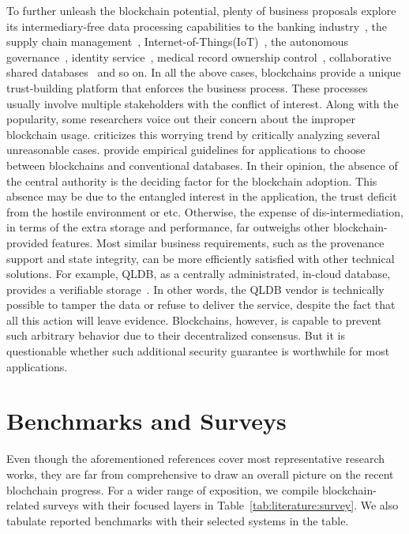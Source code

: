 To further unleash the blockchain potential, plenty of business proposals explore its intermediary-free data processing capabilities to the banking industry~\cite{guo2016blockchain}, the supply chain management~\cite{tse2017blockchain,saberi2019blockchain,korpela2017digital}, Internet-of-Things(IoT)~\cite{novo2018blockchain,huh2017managing,khan2018iot}, the autonomous governance~\cite{diallo2018egov,atzori2015blockchain}, identity service~\cite{lim2018blockchain,lootsma2017fintech}, medical record ownership control~\cite{azaria2016medrec,medilot}, collaborative shared databases~\cite{peng2020falcondb,el2019blockchaindb} and so on. 
In all the above cases, blockchains provide a unique trust-building platform that enforces the business process.
These processes usually involve multiple stakeholders with the conflict of interest.
Along with the popularity, some researchers voice out their concern about the improper blockchain usage. 
\cite{wust2018you} criticizes this worrying trend by critically analyzing several unreasonable cases. 
\cite{yaga2019blockchain,chowdhury2018blockchain,wust2018you} provide empirical guidelines for applications to choose between blockchains and conventional databases. 
In their opinion, the absence of the central authority is the deciding factor for the blockchain adoption. 
This absence may be due to the entangled interest in the application, the trust deficit from the hostile environment or etc. 
Otherwise, the expense of dis-intermediation, in terms of the extra storage and performance, far outweighs other blockchain-provided features. 
Most similar business requirements, such as the provenance support and state integrity, can be more efficiently satisfied with other technical solutions.
For example, QLDB, as a centrally administrated, in-cloud database, provides a verifiable storage~\cite{qldb}. 
In other words, the QLDB vendor is technically possible to tamper the data or refuse to deliver the service, despite the fact that all this action will leave evidence. 
Blockchains, however, is capable to prevent such arbitrary behavior due to their decentralized consensus. 
But it is questionable whether such additional security guarantee is worthwhile for most applications. 

\section{Benchmarks and Surveys}
Even though the aforementioned references cover most representative research works, they are far from comprehensive to draw an overall picture on the recent blochchain progress. 
For a wider range of exposition, we compile blockchain-related surveys with their focused layers in Table~\ref{tab:literature:survey}. We also tabulate reported benchmarks with their selected systems in the table.

